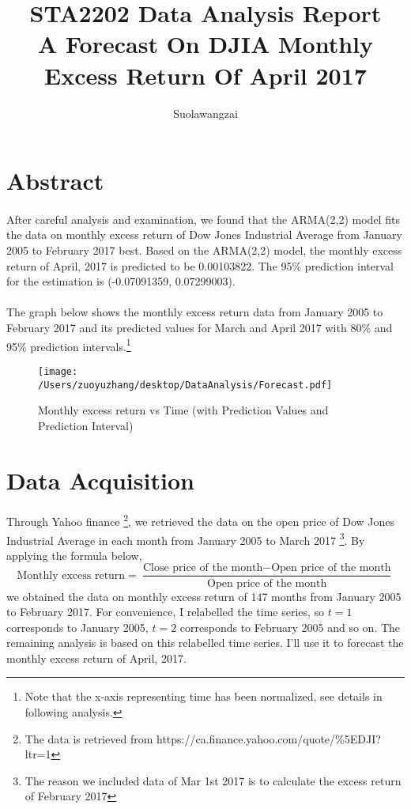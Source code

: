 \documentclass[10pt,letter]{article}
\title{\textbf{STA2202 Data Analysis Report}\\
\doublespacing
\large{A Forecast On DJIA Monthly Excess Return Of April 2017}}
\author{
  Suolawangzai\\
  \texttt{}
}
\begin{document}
 	\maketitle 
	\newpage
\section*{Abstract}
\paragraph{} After careful analysis and examination, we found that the ARMA(2,2) model fits the data on monthly excess return of Dow Jones Industrial Average from January 2005 to February 2017 best. Based on the ARMA(2,2) model, the monthly excess return of April, 2017 is predicted to be 0.00103822. The 95\% prediction interval for the estimation is (-0.07091359, 0.07299003).
\paragraph{} The graph below shows the monthly excess return data from January 2005 to February 2017 and its predicted values for March and April 2017 with 80\% and 95\% prediction intervals.\footnote[1]{Note that the x-axis representing time has been normalized, see details in following analysis.}
\begin{figure}[H]
    \centering
    \texttt{[image: /Users/zuoyuzhang/desktop/DataAnalysis/Forecast.pdf]}
    \caption{Monthly excess return vs Time (with Prediction Values and Prediction Interval)}
    \label{fig}
\end{figure}
\section*{Data Acquisition}
\paragraph{}Through Yahoo finance \footnote[2]{The data is retrieved from https://ca.finance.yahoo.com/quote/\%5EDJI?ltr=1}, we retrieved the data on the open price of Dow Jones Industrial Average in each month from January 2005 to March 2017 \footnote[3]{The reason we included data of Mar 1st 2017 is to calculate the excess return of February 2017}. By applying the formula below, 
$$\text{Monthly excess return} = \frac{\text{Close price of the month} -\text{Open price of the month}}{\text{Open price of the month}}$$
we obtained the data on monthly excess return of 147 months from January 2005 to February 2017. For convenience, I relabelled the time series, so $t=1$ corresponds to January 2005, $t=2$ corresponds to February 2005 and so on. The remaining analysis is based on this relabelled time series. I'll use it to forecast the monthly excess return of April, 2017.
\end{document}
